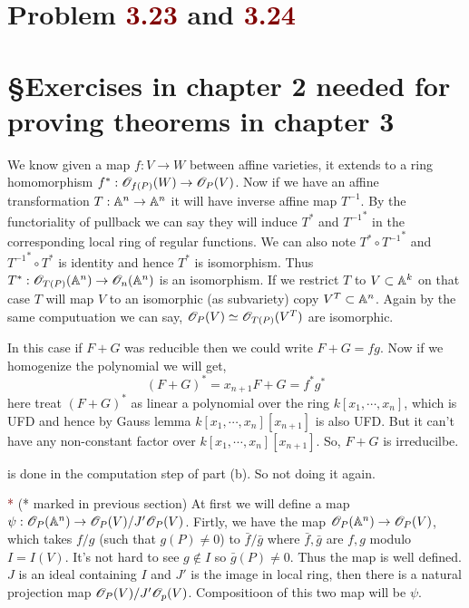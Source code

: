 \documentclass[12pt]{article}
\begin{document}
\section{Problem \textcolor{maroon}{3.23} and \textcolor{maroon}{3.24}} %


\pagebreak

\section*{\S Exercises in chapter 2 needed for proving theorems in chapter 3}

\textcolor{maroon}{} We know given a map $f : V \to W$ between affine varieties, it extends to a ring homomorphism $f^{\ast}: \mathscr{O}_{f(P)}(W) \to \mathscr{O}_{P}(V)$. Now if we have an affine transformation $T : \mathbb{A}^n \to \mathbb{A}^n$ it will have inverse affine map $T^{-1}$. By the functoriality of pullback we can say they will induce $T^{\ast}$ and ${T^{-1}}^{\ast}$ in the corresponding local ring of regular functions. We can also note $T^{\ast} \circ {T^{-1}}^{\ast}$ and ${T^{-1}}^{\ast} \circ T^{\ast}$ is identity and hence $T^{\ast}$ is isomorphism. Thus $T^{\ast}: \mathscr{O}_{T(P)}(\mathbb{A}^n) \to \mathscr{O}_n(\mathbb{A}^n)$ is an isomorphism. If we restrict $T$ to $V \subset \mathbb{A}^k$ on that case $T$ will map $V$ to an isomorphic (as subvariety) copy $V^T\subset \mathbb{A}^n$. Again by the same computuation we can say, $\mathscr{O}_{P}(V) \simeq \mathscr{O}_{T(P)}(V^T)$ are isomorphic.

\vspace*{0.2cm}

\noindent  \textcolor{maroon}{} In this case if $F+G$ was reducible then we could write $F+G = fg$. Now if we homogenize the polynomial we will get, $$(F+G)^{\ast} = x_{n+1}F+G = f^{\ast} g^{\ast}$$ here treat $(F+G)^{\ast}$ as linear a polynomial over the ring $k[x_1,\cdots,x_n]$, which is UFD and hence by Gauss lemma $k[x_1,\cdots,x_n][x_{n+1}]$ is also UFD. But it can't have any non-constant factor over $k[x_1,\cdots,x_n][x_{n+1}]$. So, $F+G$ is irreducilbe. 

\vspace*{0.2cm}

\noindent \textcolor{maroon}{} is done in the computation step of  part (b). So not doing it again.

\vspace*{0.2cm}

\noindent \textcolor{maroon}{*} (* marked in previous section) At first we will define a map $\psi : \mathscr{O}_P(\mathbb{A}^n) \to \mathscr{O}_P(V)/J'\mathscr{O}_P(V)$. Firtly, we have the map $\mathscr{O}_P(\mathbb{A}^n) \to \mathscr{O}_P(V)$, which takes $f/g$ (such that $g(P)\neq 0$) to $\bar{f}/\bar{g}$ where $\bar{f},\bar{g}$ are $f,g$ modulo $I = I(V)$. It's not hard to see $g \notin I$ so $\bar{g}(P)\neq0$. Thus the map is well defined. $J$ is an ideal containing $I$ and $J'$ is the image in local ring, then there is a natural projection map $\mathscr{O}_P(V)/J'\mathscr{O}_p(V)$. Compositioon of this two map will be $\psi$.
\end{document}
